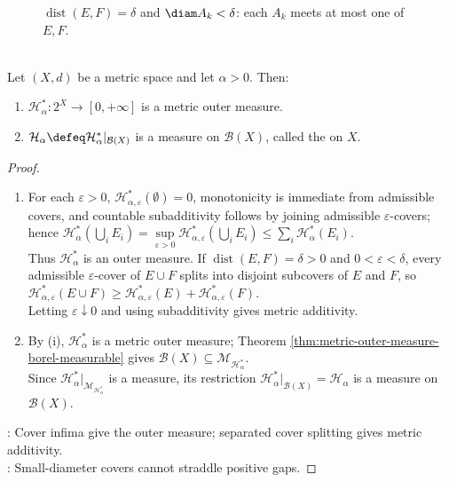 \begin{figure}[H]
  \centering
  
  \caption{$\operatorname{dist}(E,F)=\delta$ and $\diam A_k<\delta$: each $A_k$ meets at most one of $E,F$.}
  \label{fig:hausdorff-separated-cover-split}
\end{figure}

\begin{theorem} \label{thm:hausdorff-measure-borel-construction} \\
Let $(X,d)$ be a metric space and let $\alpha>0$. Then:
\begin{enumerate}[label=(\roman*)]
\setlength{\itemsep}{0pt}
\item $\mathcal{H}_\alpha^\ast:2^X\to[0,+\infty]$ is a metric outer measure.
\item $\mathcal{H}_\alpha\defeq\mathcal{H}_\alpha^\ast|_{\mathcal{B}(X)}$ is a measure on $\mathcal{B}(X)$, called the  on $X$.
\end{enumerate}
\begin{proof}
\begin{enumerate}[label=(\roman*)]
\setlength{\itemsep}{0pt}
\item For each $\varepsilon>0$, $\mathcal{H}_{\alpha,\varepsilon}^\ast(\emptyset)=0$, monotonicity is immediate from admissible covers, and countable subadditivity follows by joining admissible $\varepsilon$-covers; hence $\mathcal{H}_\alpha^\ast(\bigcup\limits_i E_i)=\sup\limits_{\varepsilon>0}\mathcal{H}_{\alpha,\varepsilon}^\ast(\bigcup\limits_i E_i)\leq\sum\limits_i\mathcal{H}_\alpha^\ast(E_i)$.\\
Thus $\mathcal{H}_\alpha^\ast$ is an outer measure. If $\operatorname{dist}(E,F)=\delta>0$ and $0<\varepsilon<\delta$, every admissible $\varepsilon$-cover of $E\cup F$ splits into disjoint subcovers of $E$ and $F$, so $\mathcal{H}_{\alpha,\varepsilon}^\ast(E\cup F)\geq\mathcal{H}_{\alpha,\varepsilon}^\ast(E)+\mathcal{H}_{\alpha,\varepsilon}^\ast(F)$.\\
Letting $\varepsilon\downarrow0$ and using subadditivity gives metric additivity.
\item By (i), $\mathcal{H}_\alpha^\ast$ is a metric outer measure; Theorem \ref{thm:metric-outer-measure-borel-measurable} gives $\mathcal{B}(X)\subseteq\mathcal{M}_{\mathcal{H}_\alpha^\ast}$.\\
Since $\mathcal{H}_\alpha^\ast|_{\mathcal{M}_{\mathcal{H}_\alpha^\ast}}$ is a measure, its restriction $\mathcal{H}_\alpha^\ast|_{\mathcal{B}(X)}=\mathcal{H}_\alpha$ is a measure on $\mathcal{B}(X)$.
\end{enumerate}
: Cover infima give the outer measure; separated cover splitting gives metric additivity.\\
: Small-diameter covers cannot straddle positive gaps.
\end{proof}
\end{theorem}

